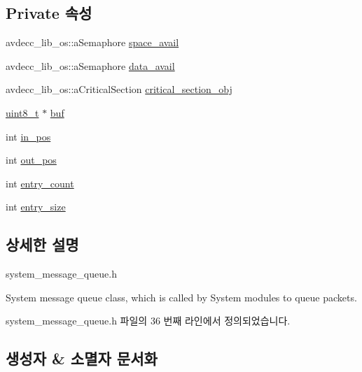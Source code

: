 \subsection*{Private 속성}
\begin{DoxyCompactItemize}
\item 
avdecc\+\_\+lib\+\_\+os\+::a\+Semaphore \hyperlink{classsystem__message__queue_a19b006401cd5fa0b091e792d95e24587}{space\+\_\+avail}
\item 
avdecc\+\_\+lib\+\_\+os\+::a\+Semaphore \hyperlink{classsystem__message__queue_a9ca216ead58e46e9cd2e0b7b7d250707}{data\+\_\+avail}
\item 
avdecc\+\_\+lib\+\_\+os\+::a\+Critical\+Section \hyperlink{classsystem__message__queue_a9beb7fdaef1ac126993e7448e60dff66}{critical\+\_\+section\+\_\+obj}
\item 
\hyperlink{stdint_8h_aba7bc1797add20fe3efdf37ced1182c5}{uint8\+\_\+t} $\ast$ \hyperlink{classsystem__message__queue_aadd9bbd25ba620d8f3ff6cbea51fdf74}{buf}
\item 
int \hyperlink{classsystem__message__queue_a8a3e7803079f633c16e621bbdbbbdaf5}{in\+\_\+pos}
\item 
int \hyperlink{classsystem__message__queue_aa2298e702cfd12ae1cbebcb523196e7c}{out\+\_\+pos}
\item 
int \hyperlink{classsystem__message__queue_af4144b5c7df947d23550c7c0b8b6afff}{entry\+\_\+count}
\item 
int \hyperlink{classsystem__message__queue_a85b70ab9a21d34366075fd47dc59f555}{entry\+\_\+size}
\end{DoxyCompactItemize}


\subsection{상세한 설명}
system\+\_\+message\+\_\+queue.\+h

System message queue class, which is called by System modules to queue packets. 

system\+\_\+message\+\_\+queue.\+h 파일의 36 번째 라인에서 정의되었습니다.



\subsection{생성자 \& 소멸자 문서화}
